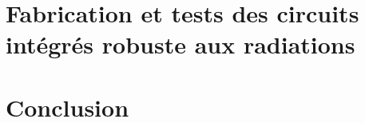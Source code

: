 \documentclass[french,12pt,a4paper]{report}
\begin{document}
\chapter{Fabrication et tests des circuits intégrés robuste aux radiations}





\chapter{Conclusion}


% 
% 



\end{document}
